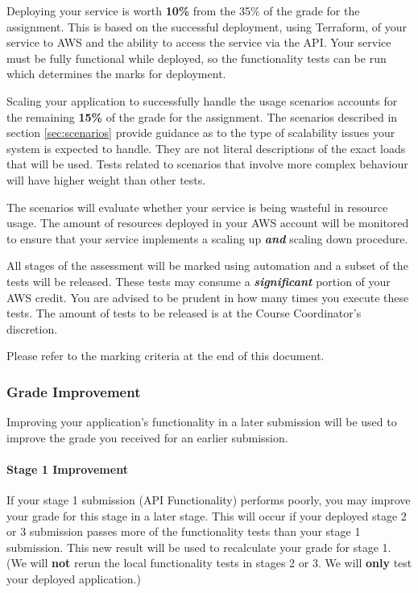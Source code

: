 \documentclass{csse4400}
\begin{document}
Deploying your service is worth \textbf{10\%} from the 35\% of the grade for the assignment.
This is based on the successful deployment, using Terraform,
of your service to AWS and the ability to access the service via the API.
Your service must be fully functional while deployed,
so the functionality tests can be run which determines the marks for deployment.

Scaling your application to successfully handle the usage scenarios accounts for the remaining \textbf{15\%}
of the grade for the assignment.
The scenarios described in section \ref{sec:scenarios} provide guidance
as to the type of scalability issues your system is expected to handle.
They are not literal descriptions of the exact loads that will be used.
Tests related to scenarios that involve more complex behaviour will have higher weight than other tests.

The scenarios will evaluate whether your service is being wasteful in resource usage.
The amount of resources deployed in your AWS account will be monitored to ensure that
your service implements a scaling up \textbf{\emph{and}} scaling down procedure.

All stages of the assessment will be marked using automation and a subset of the tests will be released.
These tests may consume a \textbf{\emph{significant}} portion of your AWS credit.
You are advised to be prudent in how many times you execute these tests.
The amount of tests to be released is at the Course Coordinator's discretion.

Please refer to the marking criteria at the end of this document.

\subsubsection{Grade Improvement}\label{sec:improve}
Improving your application's functionality in a later submission will be used to improve the grade you received for an earlier submission.

\paragraph{Stage 1 Improvement}
If your stage 1 submission (API Functionality) performs poorly, you may improve your grade for this stage in a later stage.
This will occur if your deployed stage 2 or 3 submission passes more of the functionality tests than your stage 1 submission.
This new result will be used to recalculate your grade for stage 1.
(We will \textbf{not} rerun the local functionality tests in stages 2 or 3. We will \textbf{only} test your deployed application.)
\end{document}
